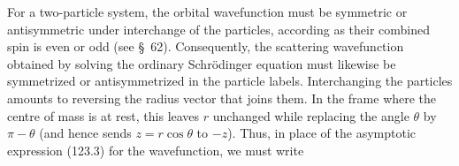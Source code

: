For a two-particle system, the orbital wavefunction must be symmetric or antisymmetric under interchange of the particles, according as their combined spin is even or odd (see \S~62). Consequently, the scattering wavefunction obtained by solving the ordinary Schrödinger equation must likewise be symmetrized or antisymmetrized in the particle labels. Interchanging the particles amounts to reversing the radius vector that joins them. In the frame where the centre of mass is at rest, this leaves $r$ unchanged while replacing the angle $\theta$ by $\pi-\theta$ (and hence sends $z=r\cos\theta$ to $-z$). Thus, in place of the asymptotic expression (123.3) for the wavefunction, we must write
